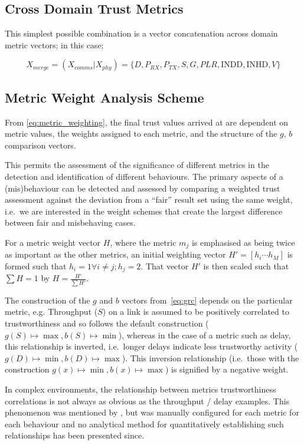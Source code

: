 \subsection{Cross Domain Trust Metrics}
This simplest possible combination is a vector concatenation across domain metric vectors; in this case; 

\begin{equation}
  X_{merge} =  (X_{comms}|X_{phy}) = \{D, P_{RX}, P_{TX}, S, G, PLR, \text{INDD}, \text{INHD}, V\}
  \label{eq:phys:vector}
\end{equation}


\subsection{Metric Weight Analysis Scheme}

From \eqref{eq:metric_weighting}, the final trust values arrived at are dependent on metric values, the weights assigned to each metric, and the structure of the $g$, $b$ comparison vectors.

This permits the assessment of the significance of different metrics in the detection and identification of different behaviours. 
The primary aspects of a (mis)behaviour can be detected and assessed by comparing a weighted trust assessment against the deviation from a ``fair'' result set using the same weight, i.e.\ we are interested in the weight schemes that create the largest difference between fair and misbehaving cases.

For a metric weight vector $H$, where the metric $m_j$ is emphasised as being twice as important as the other metrics, an initial weighting vector $H'=[h_i\cdots h_M]$ is formed such that $h_i = 1 \forall i \ne j; h_j=2$. That vector $H'$ is then scaled such that $\sum H = 1$ by $H= \frac{H'}{\sum H'}$.

The construction of the $g$ and $b$ vectors from~\autoref{eq:grc} depends on the particular metric, e.g. Throughput ($S$) on a link is assumed to be positively correlated to trustworthiness and so follows the default construction ($g(S) \mapsto \max, b(S) \mapsto \min$), whereas in the case of a metric such as delay, this relationship is inverted, i.e.\ longer delays indicate less trustworthy activity ($g(D) \mapsto \min, b(D) \mapsto \max$).
This inversion relationship (i.e.\ those with the construction $g(x) \mapsto \min, b(x) \mapsto \max$) is signified by a negative weight.

In complex environments, the relationship between metrics trustworthiness correlations is not always as obvious as the throughput / delay examples.
This phenomenon was mentioned by \citet{Guo2012}, but was manually configured for each metric for each behaviour and no analytical method for quantitatively establishing such relationships has been presented since.

